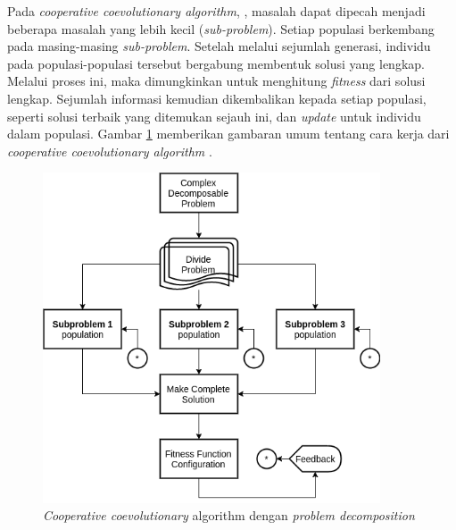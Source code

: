 Pada \textit{cooperative coevolutionary algorithm}, \citep{engelbrecht_coevolution_2007}, masalah dapat dipecah menjadi beberapa masalah yang lebih kecil (\textit{sub-problem}). Setiap populasi berkembang pada masing-masing \textit{sub-problem}. Setelah melalui sejumlah generasi, individu pada populasi-populasi tersebut bergabung membentuk solusi yang lengkap. Melalui proses ini, maka dimungkinkan untuk menghitung \textit{fitness} dari solusi lengkap. Sejumlah informasi kemudian dikembalikan kepada setiap populasi, seperti solusi terbaik yang ditemukan sejauh ini, dan \textit{update} untuk individu dalam populasi. Gambar \ref{fig:coes_overview} memberikan gambaran umum tentang cara kerja dari \textit{cooperative coevolutionary algorithm} \citep{de_oliveira_cooperative_2016}.


\begin{figure}[h]
	\centering
	\includegraphics[width=10cm]{../../Resources/Images/coes_overview}
	\caption{\textit{Cooperative coevolutionary} algorithm dengan \textit{problem decomposition}}
	\label{fig:coes_overview}
\end{figure} 



